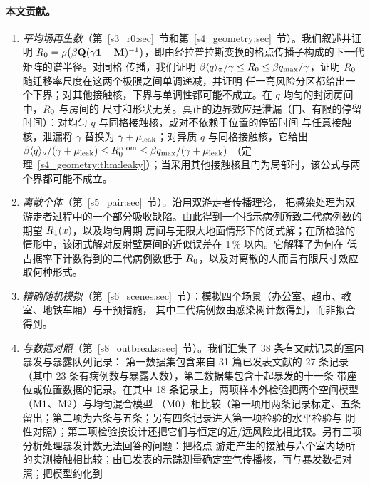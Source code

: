 \paragraph{本文贡献。}
\begin{enumerate}[label=(\roman*),leftmargin=2.2em,itemsep=1pt,topsep=3pt]
\item \emph{平均场再生数}（第~\ref{s3_r0:sec}~节和第~\ref{s4_geometry:sec}~节）。我们叙述并证明
  $R_0=\rho\bigl(\beta\mathbf{Q}(\gamma\mathbf{1}-\mathbf{M})^{-1}\bigr)$，即由经拉普拉斯变换的格点传播子构成的下一代矩阵的谱半径。对同格
  传播，我们证明 $\beta\langle q\rangle_{\pi}/\gamma\le R_0\le\beta q_{\max}/\gamma$，证明 $R_0$ 随迁移率尺度在这两个极限之间单调递减，并证明
  任一高风险分区都给出一个下界；对其他接触核，下界与单调性都可能不成立。在 $q$ 均匀的封闭房间中，$R_0$ 与房间的
  尺寸和形状无关。真正的边界效应是泄漏（门、有限的停留时间）：对均匀 $q$ 与同格接触核，或对不依赖于位置的停留时间
  与任意接触核，泄漏将 $\gamma$ 替换为 $\gamma+\mu_{\mathrm{leak}}$；对异质 $q$ 与同格接触核，它给出
  $\beta\langle q\rangle_\nu/(\gamma+\mu_{\mathrm{leak}})\le R_0^{\mathrm{room}}\le\beta q_{\max}/(\gamma+\mu_{\mathrm{leak}})$
  （定理~\ref{s4_geometry:thm:leaky}）；当采用其他接触核且门为局部时，该公式与两个界都可能不成立。
\item \emph{离散个体}（第~\ref{s5_pair:sec}~节）。沿用双游走者传播理论\citep{kenkre2014theory,giuggioli2022spatio}，
  把感染处理为双游走者过程中的一个部分吸收缺陷。由此得到一个指示病例所致二代病例数的期望 $R_1(x)$，以及均匀周期
  房间与无限大地面情形下的闭式解；在所检验的情形中，该闭式解对反射壁房间的近似误差在 1\,\% 以内。它解释了为何在
  低占据率下计数得到的二代病例数低于 $R_0$，以及对离散的人而言有限尺寸效应取何种形式。
\item \emph{精确随机模拟}（第~\ref{s6_scenes:sec}~节）：模拟四个场景（办公室、超市、教室、地铁车厢）与干预措施，
  其中二代病例数由感染树计数得到，而非拟合得到。
\item \emph{与数据对照}（第~\ref{s8_outbreaks:sec}~节）。我们汇集了 38 条有文献记录的室内暴发与暴露队列记录：
  第一数据集包含来自 31 篇已发表文献的 27 条记录（其中 23 条有病例数与暴露人数），第二数据集包含十起暴发的十一条
  带座位或位置数据的记录。在其中 18 条记录上，两项样本外检验把两个空间模型（$\mathrm{M1}$、$\mathrm{M2}$）与均匀混合模型
  （$\mathrm{M0}$）相比较（第一项用两条记录标定、五条留出；第二项为六条与五条；另有四条记录进入第一项检验的水平检验与
  阴性对照）；第二项检验按设计还把它们与恒定的近/远风险比相比较。另有三项分析处理暴发计数无法回答的问题：把格点
  游走产生的接触与六个室内场所的实测接触相比较；由已发表的示踪测量确定空气传播核，再与暴发数据对照；把模型约化到

\end{enumerate}
